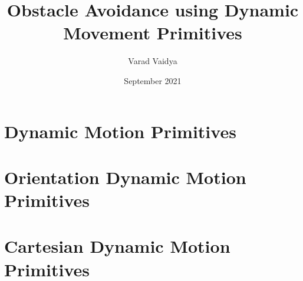 \documentclass[12pt,A4paper]{report}
\title{Obstacle Avoidance using Dynamic Movement Primitives}
\author{Varad Vaidya}
\date{September 2021}
\begin{document}


\tableofcontents

\chapter{Dynamic Motion Primitives}


\chapter{Orientation Dynamic Motion Primitives}

\chapter{Cartesian Dynamic Motion Primitives}

\end{document}
